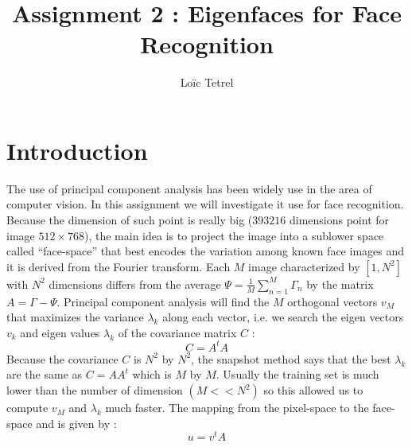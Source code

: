 \documentclass[runningheads,a4paper]{llncs}
\begin{document}
\mainmatter  %

\title{Assignment 2 : Eigenfaces for Face Recognition}


%
%
\author{Loïc Tetrel}


\maketitle


\section{Introduction}

The use of principal component analysis has been widely use in the area of computer vision. 
In this assignment we will investigate it use for face recognition. 
Because the dimension of such point is really big ($393216$ dimensions point for image $512\times768$), the main idea is to project the image into a sublower space called ``face-space'' that best encodes the variation among known face images \cite{sirovich1987low} and it is derived from the Fourier transform. 
Each $M$ image characterized by $[1,N^2]$ with $N^2$ dimensions differs from the average $\Psi=\frac{1}{M}\sum_{n=1}^M\Gamma_n$ by the matrix $A=\Gamma-\Psi$. 
Principal component analysis will find the $M$ orthogonal vectors $v_M$ that maximizes the variance $\lambda_k$ along each vector, i.e. we search the eigen vectors $v_k$ and eigen values $\lambda_k$ of the covariance matrix $C$ :
\begin{equation}
C=A^tA
\end{equation}
Because the covariance $C$ is $N^2$ by $N^2$, the snapshot method \cite{turk1991face} says that the best $\lambda_k$ are the same as $C=AA^t$ which is $M$ by $M$. 
Usually the training set is much lower than the number of dimension $(M<<N^2)$ so this allowed us to compute $v_M$ and $\lambda_k$ much faster. The mapping from the pixel-space to the face-space and is given by :
\begin{equation}
u=v^tA
\end{equation}
\end{document}
